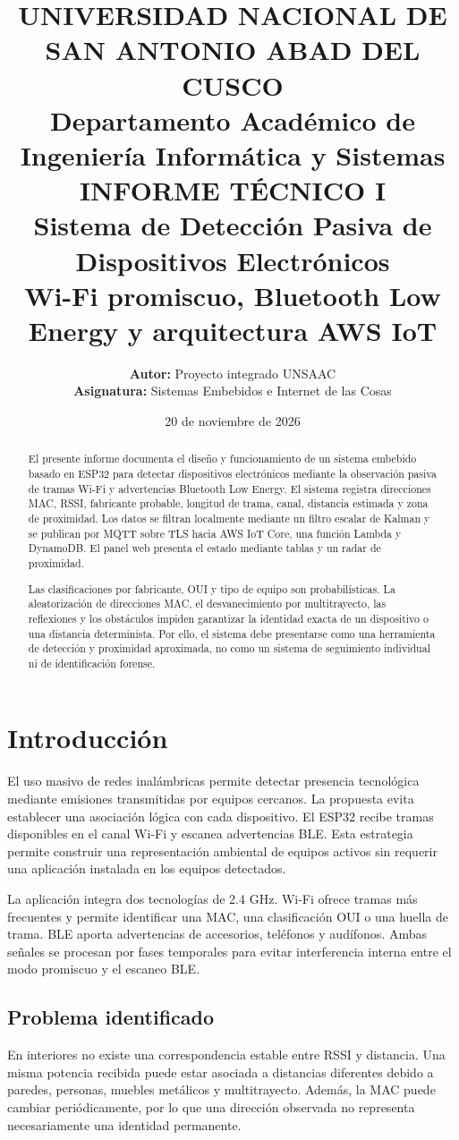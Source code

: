 \documentclass[12pt,a4paper]{article}
\title{\textbf{\Large UNIVERSIDAD NACIONAL DE SAN ANTONIO ABAD DEL CUSCO}\\[0.3cm]
\large Departamento Académico de Ingeniería Informática y Sistemas\\[1.2cm]
\textbf{\LARGE INFORME TÉCNICO I}\\[0.25cm]
\textbf{\Large Sistema de Detección Pasiva de Dispositivos Electrónicos}\\[0.25cm]
\large Wi-Fi promiscuo, Bluetooth Low Energy y arquitectura AWS IoT}
\author{\textbf{Autor:} Proyecto integrado UNSAAC\\
\textbf{Asignatura:} Sistemas Embebidos e Internet de las Cosas}
\date{20 de noviembre de 2026}
\begin{document}
\maketitle
\thispagestyle{empty}
\begin{abstract}
El presente informe documenta el diseño y funcionamiento de un sistema embebido basado en ESP32 para detectar dispositivos electrónicos mediante la observación pasiva de tramas Wi-Fi y advertencias Bluetooth Low Energy. El sistema registra direcciones MAC, RSSI, fabricante probable, longitud de trama, canal, distancia estimada y zona de proximidad. Los datos se filtran localmente mediante un filtro escalar de Kalman y se publican por MQTT sobre TLS hacia AWS IoT Core, una función Lambda y DynamoDB. El panel web presenta el estado mediante tablas y un radar de proximidad.

Las clasificaciones por fabricante, OUI y tipo de equipo son probabilísticas. La aleatorización de direcciones MAC, el desvanecimiento por multitrayecto, las reflexiones y los obstáculos impiden garantizar la identidad exacta de un dispositivo o una distancia determinista. Por ello, el sistema debe presentarse como una herramienta de detección y proximidad aproximada, no como un sistema de seguimiento individual ni de identificación forense.
\end{abstract}
\clearpage
{}
\tableofcontents
\clearpage
{}
\listoftables
\clearpage

\section{Introducción}
El uso masivo de redes inalámbricas permite detectar presencia tecnológica mediante emisiones transmitidas por equipos cercanos. La propuesta evita establecer una asociación lógica con cada dispositivo. El ESP32 recibe tramas disponibles en el canal Wi-Fi y escanea advertencias BLE. Esta estrategia permite construir una representación ambiental de equipos activos sin requerir una aplicación instalada en los equipos detectados.

La aplicación integra dos tecnologías de 2.4 GHz. Wi-Fi ofrece tramas más frecuentes y permite identificar una MAC, una clasificación OUI o una huella de trama. BLE aporta advertencias de accesorios, teléfonos y audífonos. Ambas señales se procesan por fases temporales para evitar interferencia interna entre el modo promiscuo y el escaneo BLE.

\subsection{Problema identificado}
En interiores no existe una correspondencia estable entre RSSI y distancia. Una misma potencia recibida puede estar asociada a distancias diferentes debido a paredes, personas, muebles metálicos y multitrayecto. Además, la MAC puede cambiar periódicamente, por lo que una dirección observada no representa necesariamente una identidad permanente.
\end{document}
